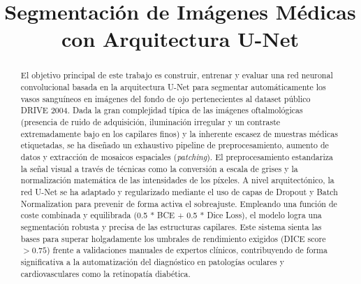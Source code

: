 \documentclass[conference]{IEEEtran}
\begin{document}
\title{Segmentación de Imágenes Médicas con Arquitectura U-Net}

\author{
\and
{}
}

\maketitle

\begin{abstract}
El objetivo principal de este trabajo es construir, entrenar y evaluar una red neuronal convolucional basada en la arquitectura U-Net para segmentar automáticamente los vasos sanguíneos en imágenes del fondo de ojo pertenecientes al dataset público DRIVE 2004. Dada la gran complejidad típica de las imágenes oftalmológicas (presencia de ruido de adquisición, iluminación irregular y un contraste extremadamente bajo en los capilares finos) y la inherente escasez de muestras médicas etiquetadas, se ha diseñado un exhaustivo pipeline de preprocesamiento, aumento de datos y extracción de mosaicos espaciales (\textit{patching}). El preprocesamiento estandariza la señal visual a través de técnicas como la conversión a escala de grises y la normalización matemática de las intensidades de los píxeles. A nivel arquitectónico, la red U-Net se ha adaptado y regularizado mediante el uso de capas de Dropout y Batch Normalization para prevenir de forma activa el sobreajuste. Empleando una función de coste combinada y equilibrada (0.5 * BCE + 0.5 * Dice Loss), el modelo logra una segmentación robusta y precisa de las estructuras capilares. Este sistema sienta las bases para superar holgadamente los umbrales de rendimiento exigidos (DICE score $> 0.75$) frente a validaciones manuales de expertos clínicos, contribuyendo de forma significativa a la automatización del diagnóstico en patologías oculares y cardiovasculares como la retinopatía diabética.
\end{abstract}
\end{document}
